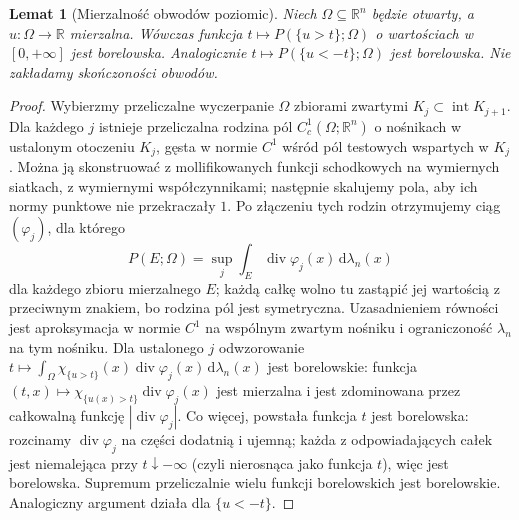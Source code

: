 \documentclass[11pt,a4paper,oneside]{book}
\numberwithin{equation}{chapter}
\theoremstyle{plain}
\newtheorem{lemat}[twierdzenie]{Lemat}
\theoremstyle{definition}
\theoremstyle{remark}
\begin{document}
\begin{lemat}[Mierzalność obwodów poziomic]
\label{lem:BV-level-meas-auditVI}
Niech $\Omega\subseteq\mathbb R^n$ będzie otwarty,
a $u:\Omega\to\mathbb R$ mierzalna. Wówczas funkcja
$t\mapsto P(\{u>t\};\Omega)$ o wartościach
w $[0,+\infty]$ jest borelowska. Analogicznie
$t\mapsto P(\{u<-t\};\Omega)$ jest borelowska.
Nie zakładamy skończoności obwodów.
\end{lemat}
\begin{proof}
Wybierzmy przeliczalne wyczerpanie $\Omega$
zbiorami zwartymi $K_j\subset\operatorname{int}K_{j+1}$.
Dla każdego $j$ istnieje przeliczalna rodzina
pól $C_c^1(\Omega;\mathbb R^n)$ o nośnikach
w ustalonym otoczeniu $K_j$, gęsta w normie $C^1$
wśród pól testowych wspartych w $K_j$.
Można ją skonstruować z mollifikowanych funkcji
schodkowych na wymiernych siatkach, z wymiernymi
współczynnikami; następnie skalujemy pola, aby
ich normy punktowe nie przekraczały $1$.
Po złączeniu tych rodzin otrzymujemy ciąg
$(\varphi_j)$, dla którego
\[
 P(E;\Omega)=\sup_j\int_E
 \operatorname{div}\varphi_j(x)\,\mathrm d\lambda_n(x)
\]
dla każdego zbioru mierzalnego $E$; każdą całkę
wolno tu zastąpić jej wartością z przeciwnym znakiem,
bo rodzina pól jest symetryczna. Uzasadnieniem
równości jest aproksymacja w normie $C^1$
na wspólnym zwartym nośniku i ograniczoność
$\lambda_n$ na tym nośniku.
Dla ustalonego $j$ odwzorowanie
$t\mapsto\int_\Omega\chi_{\{u>t\}}(x)
\operatorname{div}\varphi_j(x)\,\mathrm d\lambda_n(x)$
jest borelowskie: funkcja
$(t,x)\mapsto\chi_{\{u(x)>t\}}\operatorname{div}\varphi_j(x)$
jest mierzalna i jest zdominowana przez
całkowalną funkcję $|\operatorname{div}\varphi_j|$.
Co więcej, powstała funkcja $t$ jest borelowska:
rozcinamy $\operatorname{div}\varphi_j$ na części dodatnią
i ujemną; każda z odpowiadających całek jest
niemalejąca przy $t\downarrow-\infty$ (czyli
nierosnąca jako funkcja $t$), więc jest borelowska.
Supremum przeliczalnie wielu funkcji
borelowskich jest borelowskie. Analogiczny
argument działa dla $\{u<-t\}$.
\end{proof}
\end{document}
